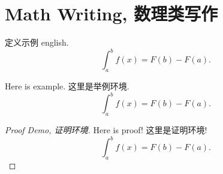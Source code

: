     \section{Math Writing, 数理类写作}
        \lipsum[1-2]
        \begin{definition} 
            定义示例 english. 
            $$
            \int_a^bf\left(x\right)=F\left(b\right)-F\left(a\right).
            $$
        \end{definition}
        \lipsum[3-4]
        \begin{example}
            Here is example. 这里是举例环境.
            $$
            \int_a^bf\left(x\right)=F\left(b\right)-F\left(a\right).
            $$
        \end{example}
        \lipsum[5-6]
        \begin{proof}[Proof Demo, 证明环境]
            Here is proof! 这里是证明环境!
            $$
            \int_a^bf\left(x\right)=F\left(b\right)-F\left(a\right).
            $$
        \end{proof}
        \lipsum[7-10]